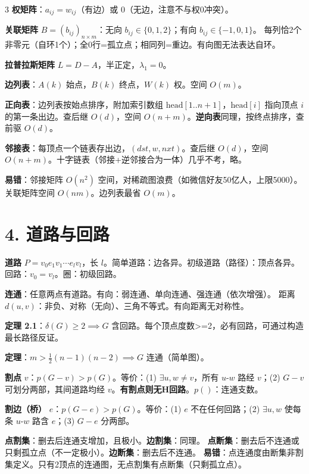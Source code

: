\documentclass[10pt,a4paper,landscape]{ctexart}
\begin{document}
\begin{multicols}{3}
\textbf{权矩阵}：$a_{ij}=w_{ij}$（有边）或 $0$（无边，注意不与权0冲突）。

\textbf{关联矩阵} $B=(b_{ij})_{n\times m}$：无向 $b_{ij}\in\{0,1,2\}$；有向 $b_{ij}\in\{-1,0,1\}$。
每列恰2个非零元（自环1个）；全0行=孤立点；相同列=重边。有向图无法表达自环。

\textbf{拉普拉斯矩阵} $L=D-A$，半正定，$\lambda_1=0$。

\textbf{边列表}：$A(k)$ 始点，$B(k)$ 终点，$W(k)$ 权。空间 $O(m)$。

\textbf{正向表}：边列表按始点排序，附加索引数组 $\mathrm{head}[1..n+1]$，$\mathrm{head}[i]$ 指向顶点 $i$ 的第一条出边。查后继 $O(d)$，空间 $O(n+m)$。\textbf{逆向表}同理，按终点排序，查前驱 $O(d)$。

\textbf{邻接表}：每顶点一个链表存出边，$(dst,w,nxt)$。查后继 $O(d)$，空间 $O(n+m)$。十字链表（邻接+逆邻接合为一体）几乎不考，略。

\textbf{易错}：邻接矩阵 $O(n^2)$ 空间，对稀疏图浪费（如微信好友50亿人，上限5000）。关联矩阵空间 $O(nm)$。边列表最省 $O(m)$。

\section*{4. 道路与回路}

\textbf{道路} $P=v_0e_1v_1\cdots e_lv_l$，长 $l$。简单道路：边各异。初级道路（路径）：顶点各异。回路：$v_0=v_l$。圈：初级回路。

\textbf{连通}：任意两点有道路。有向：弱连通、单向连通、强连通（依次增强）。
距离 $d(u,v)$：非负、对称（无向）、三角不等式。有向距离无对称性。

\textbf{定理 2.1}：$\delta(G)\geq 2\implies G$ 含回路。每个顶点度数>=2，必有回路，可通过构造最长路径反证。

\textbf{定理}：$m > \frac{1}{2}(n-1)(n-2)\implies G$ 连通（简单图）。

\textbf{割点} $v$：$p(G-v)>p(G)$。等价：(1) $\exists u,w\neq v$，所有 $u$-$w$ 路经 $v$；(2) $G-v$ 可划分两部，其间道路均经 $v$。\textbf{有割点则无H回路}。$p()$：连通支数。

\textbf{割边（桥）} $e$：$p(G-e)>p(G)$。等价：(1) $e$ 不在任何回路；(2) $\exists u,w$ 使每条 $u$-$w$ 路含 $e$；(3) $G-e$ 分两部。

\textbf{点割集}：删去后连通支增加，且极小。\textbf{边割集}：同理。
\textbf{点断集}：删去后不连通或只剩孤立点（不一定极小）。\textbf{边断集}：删去后不连通。
\textbf{易错}：点连通度由断集非割集定义。只有2顶点的连通图，无点割集有点断集（只剩孤立点）。


\end{multicols}
\end{document}
